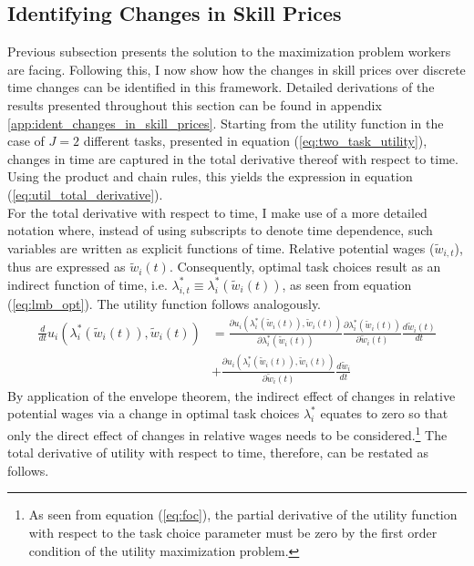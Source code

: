 \documentclass[../main.tex]{subfiles}
\begin{document}
\subsection{Identifying Changes in Skill Prices} \label{sec:identifying-changes-in-skill-prices}
Previous subsection presents the solution to the maximization problem workers are facing. Following this, I now show how the changes in skill prices over discrete time changes can be identified in this framework. Detailed derivations of the results presented throughout this section can be found in appendix \ref{app:ident_changes_in_skill_prices}. Starting from the utility function in the case of $J=2$ different tasks, presented in equation (\ref{eq:two_task_utility}), changes in time are captured in the total derivative thereof with respect to time. Using the product and chain rules, this yields the expression in equation (\ref{eq:util_total_derivative}).
\\
For the total derivative with respect to time, I make use of a more detailed notation where, instead of using subscripts to denote time dependence, such variables are written as explicit functions of time. Relative potential wages ($\tilde{w}_{i,t}$), thus are expressed as $\tilde{w}_{i}(t)$. Consequently, optimal task choices result as an indirect function of time, i.e. $\lambda_{i,t}^* \equiv \lambda_i^*(\tilde{w}_i (t))$, as seen from equation (\ref{eq:lmb_opt}). The utility function follows analogously.
\begin{align} \label{eq:util_total_derivative}
	\frac{d }{dt} u_{i}(\lambda_i^*(\tilde{w}_i(t)), \tilde{w}_i(t)) &=	\frac{\partial u_i(\lambda_i^*(\tilde{w}_i(t)), \tilde{w}_i(t))}{\partial \lambda_i^*(\tilde{w}_i(t))} \frac{\partial \lambda_i^*(\tilde{w}_i(t))}{\partial \tilde{w}_i(t)}  \frac{d \tilde{w}_i(t)}{dt} \nonumber \\
	{} &+ \frac{\partial u_i(\lambda_i^*(\tilde{w}_i(t)), \tilde{w}_i(t))} {\partial \tilde{w}_i(t)} \frac{d \tilde{w}_i}{dt} 
\end{align}
By application of the envelope theorem, the indirect effect of changes in relative potential wages via a change in optimal task choices $\lambda_i^*$ equates to zero so that only the direct effect of changes in relative wages needs to be considered.\footnote{As seen from equation (\ref{eq:foc}), the partial derivative of the utility function with respect to the task choice parameter must be zero by the first order condition of the utility maximization problem.} The total derivative of utility with respect to time, therefore, can be restated as follows.
\end{document}
